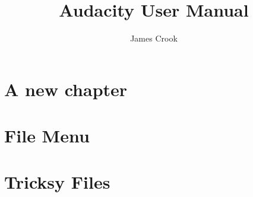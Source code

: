 \documentclass[openany]{book}
\begin{document}
{\let\cleardoublepage\clearpage 
\title{Audacity User Manual}
\author{James Crook}
}


\label{XXX}
\label{bottomright}
\label{topleft}

%
%
%
%
%



%

\chapter{A new chapter}

\begin{multicols}{2}

\end{multicols}

\chapter{File Menu}
%

%

\chapter{Tricksy Files}

\end{document}
